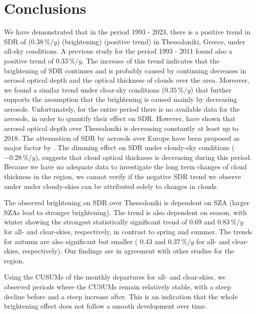 \documentclass[applsci,article,submit,moreauthors,pdftex]{Definitions/mdpi}
\providecommand{\DIFadd}[1]{{\protect\color{blue}\uwave{#1}}} %
\providecommand{\DIFdel}[1]{{\protect\color{red}\sout{#1}}}                      %
\providecommand{\DIFaddbegin}{} %
\providecommand{\DIFaddend}{} %
\providecommand{\DIFdelbegin}{} %
\providecommand{\DIFdelend}{} %
\begin{document}
\hypertarget{conclusions}{%
\section{Conclusions}\label{conclusions}}

We have demonstrated that in the period 1993 - 2023, there is a positive
trend in SDR of (\(0.38\,\%/y\)) (brightening) (positive trend) in
Thessaloniki, Greece, under all-sky conditions. A previous study
\citep{Bais2013} for the period 1993 - 2011 found also a positive trend
of \(0.33\,\%/y\). The increase of this trend indicates that the
brightening of SDR continues and is probably caused by continuing
decreases in aerosol optical depth and the optical thickness of clouds
over the area. Moreover, we found a similar trend under clear-sky
conditions (\DIFdelbegin \DIFdel{\(0.35\,\%/y\)}\DIFdelend \DIFaddbegin \DIFadd{\(0.097\,\%/y\)}\DIFaddend ) that further supports the assumption that
the brightening is caused mainly by decreasing aerosols. Unfortunately,
for the entire period there is no available data for the aerosols, in
order to quantify their effect on SDR. However, \citet{Siomos2020} have
shown that aerosol optical depth over Thessaloniki is decreasing
constantly at least up to 2018. The attenuation of SDR by aerosols over
Europe have been proposed as major factor by \citet{Wild2021}. The
dimming effect on SDR under cloudy-sky conditions (\DIFdelbegin \DIFdel{\(-0.28\,\%/y\)}\DIFdelend \DIFaddbegin \DIFadd{\(0.25\,\%/y\)}\DIFaddend ),
suggests that cloud optical thickness is decreasing during this period.
Because we have no adequate data to investigate the long term changes of
cloud thickness in the region, we cannot verify if the negative SDR
trend we observe under under cloudy-skies can be attributed solely to
changes in clouds.

The observed brightening on SDR over Thessaloniki is dependent on SZA
(larger SZAs lead to stronger brightening). The trend is also dependent
on season, with winter showing the strongest statistically significant
trend of \(0.69\) and \DIFdelbegin \DIFdel{\(0.83\,\%/y\) }\DIFdelend \DIFaddbegin \DIFadd{\(0.36\,\%/y\) }\DIFaddend for all- and clear-skies,
respectively, in contrast to spring and summer. The trends for autumn
are also significant but smaller ( \(0.43\) and \DIFdelbegin \DIFdel{\(0.37\,\%/y\) }\DIFdelend \DIFaddbegin \DIFadd{\(0.11\,\%/y\) }\DIFaddend for all-
and clear-skies, respectively). Our findings are in agreement with other
studies for the region.

Using the CUSUMs of the monthly departures for all- and clear-skies, we
observed periods where the CUSUMs remain relatively stable, with a steep
decline before and a steep increase after. This is an indication that
the whole brightening effect does not follow a smooth development over
time.
\end{document}
